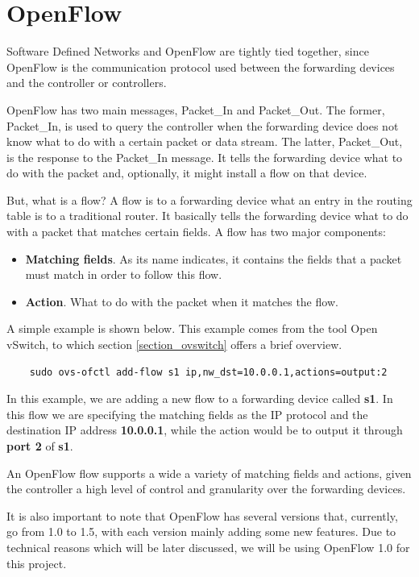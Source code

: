 \section{OpenFlow}
Software Defined Networks and OpenFlow\cite{openflow_specfication} are tightly tied together, since OpenFlow is the communication protocol used between the forwarding devices and the controller or controllers. 

OpenFlow has two main messages, Packet\_In and Packet\_Out. The former, Packet\_In, is used to query the controller when the forwarding device does not know what to do with a certain packet or data stream. The latter, Packet\_Out, is the response to the Packet\_In message. It tells the forwarding device what to do with the packet and, optionally, it might install a flow on that device.

But, what is a flow? A flow is to a forwarding device what an entry in the routing table is to a traditional router. It basically tells the forwarding device what to do with a packet that matches certain fields. A flow has two major components:
\begin{itemize}
    \item \textbf{Matching fields}. As its name indicates, it contains the fields that a packet must match in order to follow this flow.   
    \item \textbf{Action}. What to do with the packet when it matches the flow.
\end{itemize}

A simple example is shown below. This example comes from the tool Open vSwitch, to which section \ref{section_ovswitch} offers a brief overview.
\begin{lstlisting}
    sudo ovs-ofctl add-flow s1 ip,nw_dst=10.0.0.1,actions=output:2
\end{lstlisting}

In this example, we are adding a new flow to a forwarding device called \textbf{s1}. In this flow we are specifying the matching fields as the IP protocol and the destination IP address \textbf{10.0.0.1}, while the action would be to output it through \textbf{port 2} of \textbf{s1}.

An OpenFlow flow supports a wide a variety of matching fields and actions, given the controller a high level of control and granularity over the forwarding devices.

It is also important to note that OpenFlow has several versions that, currently, go from 1.0 to 1.5, with each version mainly adding some new features. Due to technical reasons which will be later discussed, we will be using OpenFlow 1.0 for this project.

